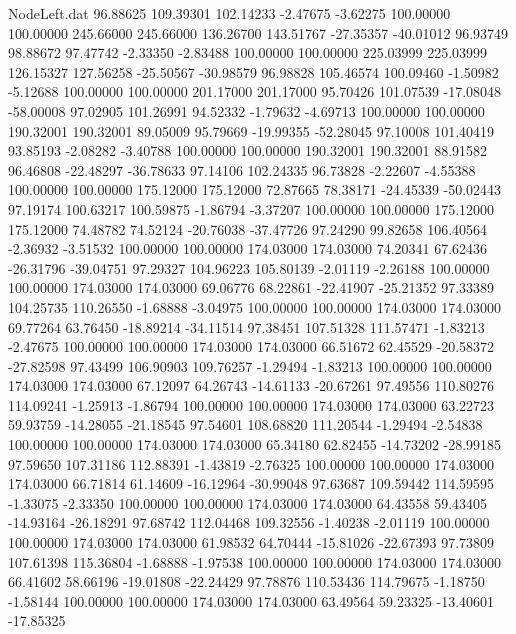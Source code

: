 \begin{filecontents}{NodeLeft.dat}
  96.88625  109.39301  102.14233    -2.47675   -3.62275  100.00000  100.00000  245.66000  245.66000  136.26700  143.51767  -27.35357  -40.01012
  96.93749   98.88672   97.47742    -2.33350   -2.83488  100.00000  100.00000  225.03999  225.03999  126.15327  127.56258  -25.50567  -30.98579
  96.98828  105.46574  100.09460    -1.50982   -5.12688  100.00000  100.00000  201.17000  201.17000   95.70426  101.07539  -17.08048  -58.00008
  97.02905  101.26991   94.52332    -1.79632   -4.69713  100.00000  100.00000  190.32001  190.32001   89.05009   95.79669  -19.99355  -52.28045
  97.10008  101.40419   93.85193    -2.08282   -3.40788  100.00000  100.00000  190.32001  190.32001   88.91582   96.46808  -22.48297  -36.78633
  97.14106  102.24335   96.73828    -2.22607   -4.55388  100.00000  100.00000  175.12000  175.12000   72.87665   78.38171  -24.45339  -50.02443
  97.19174  100.63217  100.59875    -1.86794   -3.37207  100.00000  100.00000  175.12000  175.12000   74.48782   74.52124  -20.76038  -37.47726
  97.24290   99.82658  106.40564    -2.36932   -3.51532  100.00000  100.00000  174.03000  174.03000   74.20341   67.62436  -26.31796  -39.04751
  97.29327  104.96223  105.80139    -2.01119   -2.26188  100.00000  100.00000  174.03000  174.03000   69.06776   68.22861  -22.41907  -25.21352
  97.33389  104.25735  110.26550    -1.68888   -3.04975  100.00000  100.00000  174.03000  174.03000   69.77264   63.76450  -18.89214  -34.11514
  97.38451  107.51328  111.57471    -1.83213   -2.47675  100.00000  100.00000  174.03000  174.03000   66.51672   62.45529  -20.58372  -27.82598
  97.43499  106.90903  109.76257    -1.29494   -1.83213  100.00000  100.00000  174.03000  174.03000   67.12097   64.26743  -14.61133  -20.67261
  97.49556  110.80276  114.09241    -1.25913   -1.86794  100.00000  100.00000  174.03000  174.03000   63.22723   59.93759  -14.28055  -21.18545
  97.54601  108.68820  111.20544    -1.29494   -2.54838  100.00000  100.00000  174.03000  174.03000   65.34180   62.82455  -14.73202  -28.99185
  97.59650  107.31186  112.88391    -1.43819   -2.76325  100.00000  100.00000  174.03000  174.03000   66.71814   61.14609  -16.12964  -30.99048
  97.63687  109.59442  114.59595    -1.33075   -2.33350  100.00000  100.00000  174.03000  174.03000   64.43558   59.43405  -14.93164  -26.18291
  97.68742  112.04468  109.32556    -1.40238   -2.01119  100.00000  100.00000  174.03000  174.03000   61.98532   64.70444  -15.81026  -22.67393
  97.73809  107.61398  115.36804    -1.68888   -1.97538  100.00000  100.00000  174.03000  174.03000   66.41602   58.66196  -19.01808  -22.24429
  97.78876  110.53436  114.79675    -1.18750   -1.58144  100.00000  100.00000  174.03000  174.03000   63.49564   59.23325  -13.40601  -17.85325

\end{filecontents}

